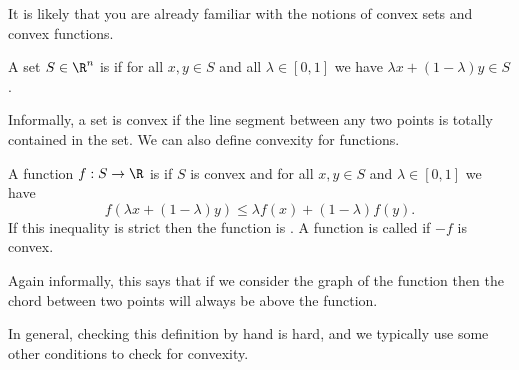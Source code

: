 \documentclass[a4paper]{article}
\begin{document}
It is likely that you are already familiar with the notions of convex sets and convex functions.

\begin{definition}
    A set $S \in \R^n$ is  if for all $x, y \in S$ and all $\lambda \in [0, 1]$ we have $\lambda x + (1 - \lambda) y \in S$.
\end{definition}

Informally, a set is convex if the line segment between any two points is totally contained in the set. We can also define convexity for functions.

\begin{definition}
    A function $f: S \rightarrow \R$ is  if $S$ is convex and for all $x, y \in S$ and $\lambda \in [0, 1]$ we have
    $$
    f(\lambda x + (1 - \lambda) y) \leq \lambda f(x) + (1 - \lambda) f(y).
    $$
    If this inequality is strict then the function is . A function is called  if $-f$ is convex.
\end{definition}

Again informally, this says that if we consider the graph of the function then the chord between two points will always be above the function.

In general, checking this definition by hand is hard, and we typically use some other conditions to check for convexity.
\end{document}
